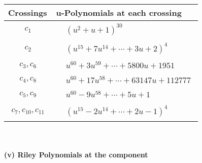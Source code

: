 \documentclass[1p]{elsarticle_modified}
\theoremstyle{definition}
\begin{document}
\begin{tabular}{m{50pt}|m{274pt}}
Crossings & \hspace{64pt}u-Polynomials at each crossing \\
\hline $$\begin{aligned}c_{1}\end{aligned}$$&$\begin{aligned}
&(u^2+u+1)^{30}
\end{aligned}$\\
\hline $$\begin{aligned}c_{2}\end{aligned}$$&$\begin{aligned}
&(u^{15}+7 u^{14}+\cdots+3 u+2)^{4}
\end{aligned}$\\
\hline $$\begin{aligned}c_{3},c_{6}\end{aligned}$$&$\begin{aligned}
&u^{60}+3 u^{59}+\cdots+5800 u+1951
\end{aligned}$\\
\hline $$\begin{aligned}c_{4},c_{8}\end{aligned}$$&$\begin{aligned}
&u^{60}+17 u^{58}+\cdots+63147 u+112777
\end{aligned}$\\
\hline $$\begin{aligned}c_{5},c_{9}\end{aligned}$$&$\begin{aligned}
&u^{60}-9 u^{58}+\cdots+5 u+1
\end{aligned}$\\
\hline $$\begin{aligned}c_{7},c_{10},c_{11}\end{aligned}$$&$\begin{aligned}
&(u^{15}-2 u^{14}+\cdots+2 u-1)^{4}
\end{aligned}$\\
\hline
\end{tabular}\\~\\
\newpage\renewcommand{\arraystretch}{1}
\flushleft \textbf{(v) Riley Polynomials at the component}\newline \\
\end{document}
